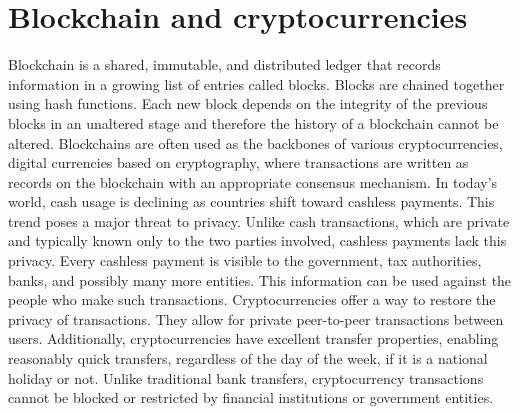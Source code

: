 \section{Blockchain and cryptocurrencies}
Blockchain is a shared, immutable, and distributed ledger that records information in a growing list of entries called blocks. Blocks are chained together using hash functions. Each new block depends on the integrity of the previous blocks in an unaltered stage and therefore the history of a blockchain cannot be altered. Blockchains are often used as the backbones of various cryptocurrencies, digital currencies based on cryptography, where transactions are written as records on the blockchain with an appropriate consensus mechanism.
In today’s world, cash usage is declining as countries shift toward cashless payments. This trend poses a major threat to privacy. Unlike cash transactions, which are private and typically known only to the two parties involved, cashless payments lack this privacy. Every cashless payment is visible to the government, tax authorities, banks, and possibly many more entities. This information can be used against the people who make such transactions. Cryptocurrencies offer a way to restore the privacy of transactions. They allow for private peer-to-peer transactions between users. Additionally, cryptocurrencies have excellent transfer properties, enabling reasonably quick transfers, regardless of the day of the week, if it is a national holiday or not. Unlike traditional bank transfers, cryptocurrency transactions cannot be blocked or restricted by financial institutions or government entities.


